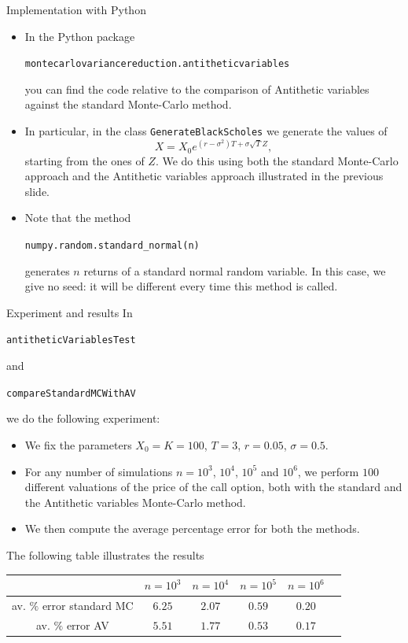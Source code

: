 \documentclass[9 pt]{beamer} %
\begin{document}
\begin{frame}{Implementation with Python}
\begin{itemize}
\item In the Python package 
\begin{center}
\texttt{montecarlovariancereduction.antitheticvariables}
\end{center}
you can find the code relative to the comparison of Antithetic variables against the standard Monte-Carlo method.
\item In particular, in the class \texttt{GenerateBlackScholes} we generate the values of 
$$
X = X_0 e^{(r-\sigma^2)T + \sigma \sqrt{T} Z},
$$
starting from the ones of $Z$. We do this using both the standard Monte-Carlo approach and the Antithetic variables approach illustrated in the previous slide.
\item  Note that the method
\begin{center}
\texttt{numpy.random.standard\_normal(n)}
\end{center}
generates $n$ returns of a standard normal random variable. In this case, we give no seed: it will be different every time this method is called.
\end{itemize}
\end{frame}
 
 
 \begin{frame}{Experiment and results}
  In  
  \begin{center}
\texttt{antitheticVariablesTest}
\end{center}
and
\begin{center}
\texttt{compareStandardMCWithAV}
\end{center}
we do the following experiment:
\begin{itemize}
\item We fix the parameters $X_0=K=100$, $T=3$, $r=0.05$, $\sigma=0.5$.
\item For any number of simulations $n=10^3$, $10^4$, $10^5$ and $10^6$, we perform $100$ different valuations of the price of the call option, both with the standard and the Antithetic variables Monte-Carlo method. 
\item We then compute the average percentage error for both the methods.
\end{itemize}
The following table illustrates the results
\begin{table}[H]
 \begin{tabular}{|c|c|c|c|c|c|}
 \hline
& $n=10^3$ & $n=10^4$ & $n=10^5$ &  $n=10^6$\\
  \hline
  av. $\%$ error standard MC  & $6.25$ & $2.07$ & $0.59$ &  $0.20$    \\
 \hline
   av. $\%$ error AV & $5.51$ & $1.77$ & $0.53$ &  $0.17$   \\
\hline
\end{tabular}
\end{table}
\end{frame}
\end{document}
